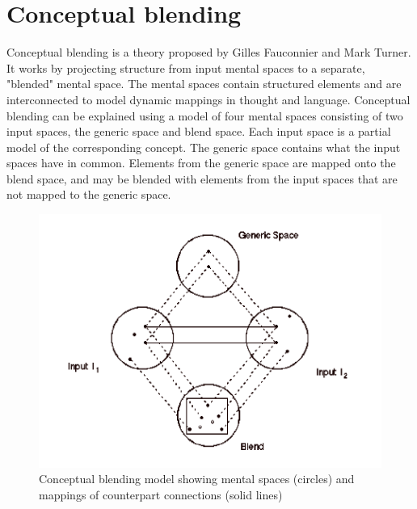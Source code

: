 
\section{Conceptual blending}
Conceptual blending is a theory proposed by Gilles Fauconnier and Mark Turner. It works by projecting structure from input mental spaces to a separate, "blended" mental space. \parencite{fauconnier1998conceptual}
The mental spaces contain structured elements and are interconnected to model dynamic mappings in thought and language.
Conceptual blending can be explained using a model of four mental spaces consisting of two input spaces, the generic space and blend space. Each input space is a partial model of the corresponding concept. The generic space contains what the input spaces have in common. Elements from the generic space are mapped onto the blend space, and may be blended with elements from the input spaces that are not mapped to the generic space.
\begin{figure}
\centering
\includegraphics[width=0.7\linewidth]{"Figures/concept blending firkant"}
\caption{Conceptual blending model showing mental spaces (circles) and mappings of counterpart connections (solid lines) \parencite{fauconnier1998conceptualfigure}}
\label{fig:concept-blending-firkant}
\end{figure}


